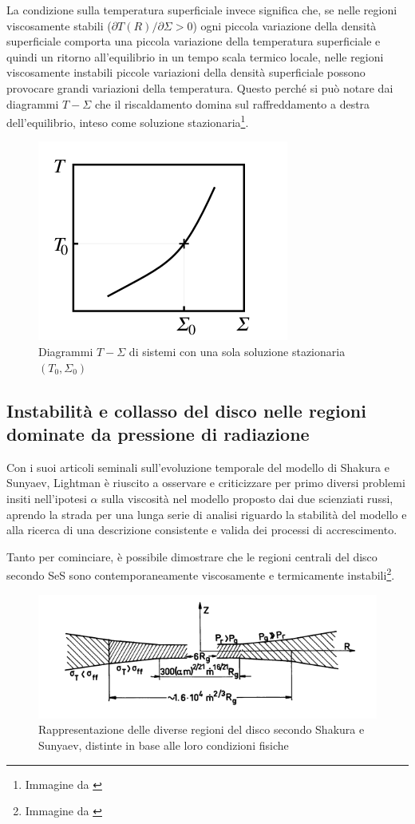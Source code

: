 \documentclass[a4paperbi]{article}
\begin{document}
	La condizione sulla temperatura superficiale invece significa che, se nelle regioni viscosamente stabili ($\partial T(R)/\partial\Sigma>0$) ogni piccola variazione della densità superficiale comporta una piccola variazione della temperatura superficiale e quindi un ritorno all'equilibrio in un tempo scala termico locale, nelle regioni viscosamente instabili piccole variazioni della densità superficiale possono provocare grandi variazioni della temperatura. Questo perché si può notare dai diagrammi $T-\Sigma$ che il riscaldamento domina sul raffreddamento a destra dell'equilibrio, inteso come soluzione stazionaria\footnote{Immagine da \cite{FrankKingRaineAccretionPower}}.	
	
	\begin{figure}[H]
		\centering
		\includegraphics[width=0.4\linewidth]{TemperaturaDensita}
		\caption{Diagrammi $T-\Sigma$ di sistemi con una sola soluzione stazionaria $(T_0,\Sigma_0)$}
		\label{fig:TemperaturaDensita}
	\end{figure}
	
\subsection{Instabilità e collasso del disco nelle regioni dominate da pressione di radiazione}

	Con i suoi articoli seminali sull'evoluzione temporale del modello di Shakura e Sunyaev, Lightman è riuscito a osservare e criticizzare per primo diversi problemi insiti nell'ipotesi $\alpha$ sulla viscosità nel modello proposto dai due scienziati russi, aprendo la strada per una lunga serie di analisi riguardo la stabilità del modello e alla ricerca di una descrizione consistente e valida dei processi di accrescimento.
	
	Tanto per cominciare, è possibile dimostrare che le regioni centrali del disco secondo SeS sono contemporaneamente viscosamente e termicamente instabili\footnote{Immagine da \cite{ShakuraSunyaev1973}}.
	
	\begin{figure}[H]
		\centering
		\includegraphics[width=0.9\linewidth]{RegioniDisco}
		\caption{Rappresentazione delle diverse regioni del disco secondo Shakura e Sunyaev, distinte in base alle loro condizioni fisiche}
		\label{fig:RegioniDisco}
	\end{figure}
	
\end{document}
